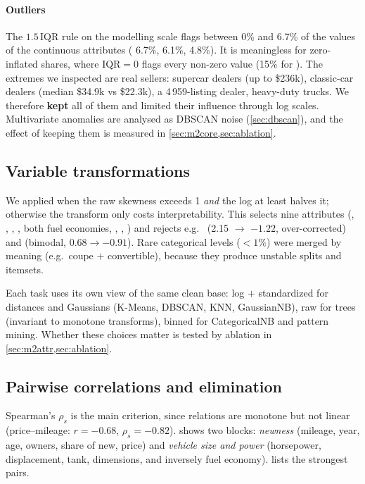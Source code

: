 \paragraph{Outliers} The $1.5\,$IQR rule on the modelling scale flags between 0\% and 6.7\% of the values of the continuous attributes ( 6.7\%,  6.1\%,  4.8\%). It is meaningless for zero-inflated shares, where $\mathrm{IQR}=0$ flags every non-zero value (15\% for ). The extremes we inspected are real sellers: supercar dealers (up to \$236k), classic-car dealers (median \$34.9k vs \$22.3k), a 4\,959-listing dealer, heavy-duty trucks. We therefore \textbf{kept} all of them and limited their influence through log scales. Multivariate anomalies are analysed as DBSCAN noise (\cref{sec:dbscan}), and the effect of keeping them is measured in \cref{sec:m2core,sec:ablation}.

\subsection{Variable transformations}\label{sec:trans}
We applied  when the raw skewness exceeds 1 \emph{and} the log at least halves it; otherwise the transform only costs interpretability. This selects nine attributes (, , , , both fuel economies, , , ) and rejects e.g.\  (2.15 $\to$ $-1.22$, over-corrected) and  (bimodal, $0.68\to-0.91$). Rare categorical levels ($<1\%$) were merged by meaning (e.g.\ coupe $+$ convertible), because they produce unstable splits and itemsets.

Each task uses its own view of the same clean base: log $+$ standardized for distances and Gaussians (K-Means, DBSCAN, KNN, GaussianNB), raw for trees (invariant to monotone transforms), binned for CategoricalNB and pattern mining. Whether these choices matter is tested by ablation in \cref{sec:m2attr,sec:ablation}.

\subsection{Pairwise correlations and elimination}\label{sec:corr}
Spearman's $\rho_s$ is the main criterion, since relations are monotone but not linear (price--mileage: $r=-0.68$, $\rho_s=-0.82$).  shows two blocks: \emph{newness} (mileage, year, age, owners, share of new, price) and \emph{vehicle size and power} (horsepower, displacement, tank, dimensions, and inversely fuel economy).  lists the strongest pairs.

